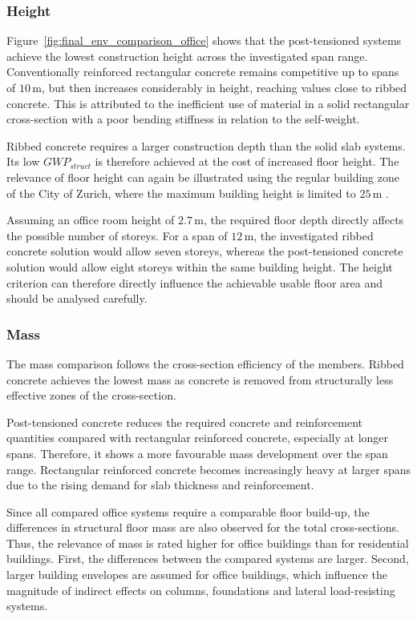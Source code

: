 \subsubsection{Height}

Figure~\ref{fig:final_env_comparison_office} shows that the post-tensioned systems achieve the lowest construction height across the investigated span range. Conventionally reinforced rectangular concrete remains competitive up to spans of \(10\,\mathrm{m}\), but then increases considerably in height, reaching values close to ribbed concrete. This is attributed to the inefficient use of material in a solid rectangular cross-section with a poor bending stiffness in relation to the self-weight.

Ribbed concrete requires a larger construction depth than the solid slab systems. Its low \(GWP_{struct}\) is therefore achieved at the cost of increased floor height. The relevance of floor height can again be illustrated using the regular building zone of the City of Zurich, where the maximum building height is limited to \(25\,\mathrm{m}\) \cite{StadtZuerich_Bauordnung_700100}.

Assuming an office room height of \(2.7\,\mathrm{m}\), the required floor depth directly affects the possible number of storeys. For a span of \(12\,\mathrm{m}\), the investigated ribbed concrete solution would allow seven storeys, whereas the post-tensioned concrete solution would allow eight storeys within the same building height. The height criterion can therefore directly influence the achievable usable floor area and should be analysed carefully.

\subsubsection{Mass}

The mass comparison follows the cross-section efficiency of the members. Ribbed concrete achieves the lowest mass as concrete is removed from structurally less effective zones of the cross-section. 

Post-tensioned concrete reduces the required concrete and reinforcement quantities compared with rectangular reinforced concrete, especially at longer spans. Therefore, it shows a more favourable mass development over the span range. Rectangular reinforced concrete becomes increasingly heavy at larger spans due to the rising demand for slab thickness and reinforcement.

Since all compared office systems require a comparable floor build-up, the differences in structural floor mass are also observed for the total cross-sections. Thus, the relevance of mass is rated higher for office buildings than for residential buildings. First, the differences between the compared systems are larger. Second, larger building envelopes are assumed for office buildings, which influence the magnitude of indirect effects on columns, foundations and lateral load-resisting systems.

